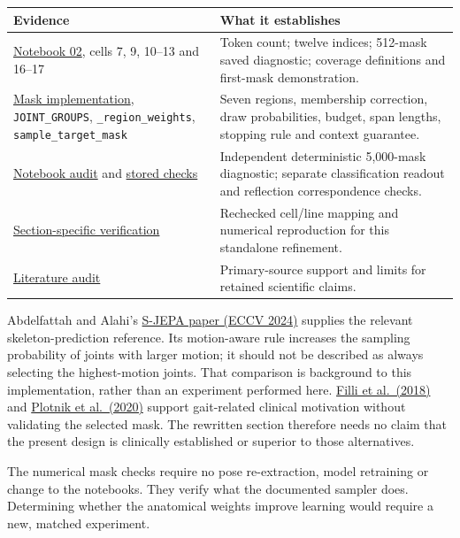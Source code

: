 \documentclass[
  11pt,
]{article}
\newcounter{none} %
\begin{document}
{\def\LTcaptype{none} %
\begin{longtable}[]{@{}
  >{\raggedright\arraybackslash}p{}
  >{\raggedright\arraybackslash}p{}@{}}
\toprule\noalign{}
\begin{minipage}[b]{\linewidth}\raggedright
Evidence
\end{minipage} & \begin{minipage}[b]{\linewidth}\raggedright
What it establishes
\end{minipage} \\
\midrule\noalign{}
\endhead
\bottomrule\noalign{}
\endlastfoot
\href{../../02_anatomical_mask_and_tokenization.ipynb}{Notebook 02},
cells 7, 9, 10--13 and 16--17 & Token count; twelve indices; 512-mask
saved diagnostic; coverage definitions and first-mask demonstration. \\
\href{../../sjepa/masking_v2.py}{Mask implementation},
\texttt{JOINT\_GROUPS}, \texttt{\_region\_weights},
\texttt{sample\_target\_mask} & Seven regions, membership correction,
draw probabilities, budget, span lengths, stopping rule and context
guarantee. \\
\href{evidence/notebook-audit.md}{Notebook audit} and
\href{evidence/notebook-audit-checks.json}{stored checks} & Independent
deterministic 5,000-mask diagnostic; separate classification readout and
reflection correspondence checks. \\
\href{evidence/section-4.1-verification.md}{Section-specific
verification} & Rechecked cell/line mapping and numerical reproduction
for this standalone refinement. \\
\href{evidence/venue-and-literature.md}{Literature audit} &
Primary-source support and limits for retained scientific claims. \\
\end{longtable}
}

Abdelfattah and Alahi's
\href{https://www.ecva.net/papers/eccv_2024/papers_ECCV/papers/04755.pdf}{S-JEPA
paper (ECCV 2024)} supplies the relevant skeleton-prediction reference.
Its motion-aware rule increases the sampling probability of joints with
larger motion; it should not be described as always selecting the
highest-motion joints. That comparison is background to this
implementation, rather than an experiment performed here.
\href{https://www.nature.com/articles/s41598-018-22676-0}{Filli et
al.~(2018)} and
\href{https://www.nature.com/articles/s41598-020-68263-0}{Plotnik et
al.~(2020)} support gait-related clinical motivation without validating
the selected mask. The rewritten section therefore needs no claim that
the present design is clinically established or superior to those
alternatives.

The numerical mask checks require no pose re-extraction, model
retraining or change to the notebooks. They verify what the documented
sampler does. Determining whether the anatomical weights improve
learning would require a new, matched experiment.
\end{document}
